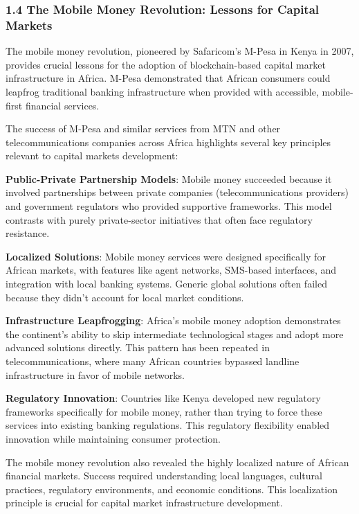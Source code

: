 \documentclass[12pt]{article}
\begin{document}
\subsubsection{1.4 The Mobile Money Revolution: Lessons for Capital Markets} %

The mobile money revolution, pioneered by Safaricom's M-Pesa in Kenya in 2007, provides crucial lessons for the adoption of blockchain-based capital market infrastructure in Africa. M-Pesa demonstrated that African consumers could leapfrog traditional banking infrastructure when provided with accessible, mobile-first financial services.

The success of M-Pesa and similar services from MTN and other telecommunications companies across Africa highlights several key principles relevant to capital markets development:

\textbf{Public-Private Partnership Models}: Mobile money succeeded because it involved partnerships between private companies (telecommunications providers) and government regulators who provided supportive frameworks. This model contrasts with purely private-sector initiatives that often face regulatory resistance.

\textbf{Localized Solutions}: Mobile money services were designed specifically for African markets, with features like agent networks, SMS-based interfaces, and integration with local banking systems. Generic global solutions often failed because they didn't account for local market conditions.

\textbf{Infrastructure Leapfrogging}: Africa's mobile money adoption demonstrates the continent's ability to skip intermediate technological stages and adopt more advanced solutions directly. This pattern has been repeated in telecommunications, where many African countries bypassed landline infrastructure in favor of mobile networks.

\textbf{Regulatory Innovation}: Countries like Kenya developed new regulatory frameworks specifically for mobile money, rather than trying to force these services into existing banking regulations. This regulatory flexibility enabled innovation while maintaining consumer protection.

The mobile money revolution also revealed the highly localized nature of African financial markets. Success required understanding local languages, cultural practices, regulatory environments, and economic conditions. This localization principle is crucial for capital market infrastructure development.
\end{document}
